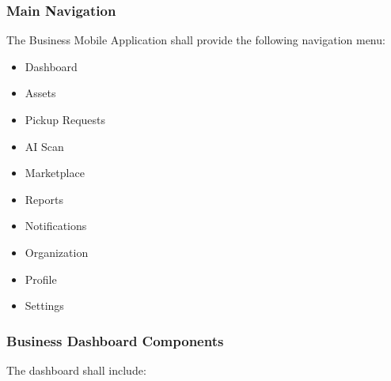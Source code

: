 
\subsubsection*{Main Navigation}

The Business Mobile Application shall provide the following navigation
menu:

\begin{itemize}

\item Dashboard

\item Assets

\item Pickup Requests

\item AI Scan

\item Marketplace

\item Reports

\item Notifications

\item Organization

\item Profile

\item Settings

\end{itemize}


\subsubsection*{Business Dashboard Components}

The dashboard shall include:

